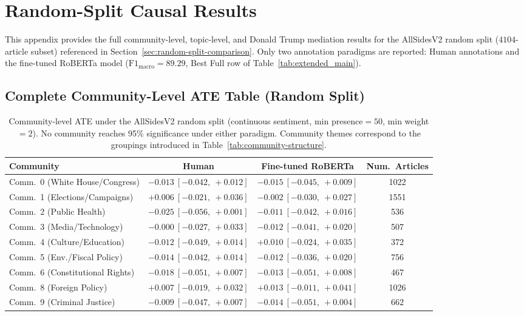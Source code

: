 \chapter{Random-Split Causal Results}
\label{sec:appendix-random-split}

This appendix provides the full community-level, topic-level, and Donald Trump mediation results for the AllSidesV2 random split ($\num{4104}$-article subset) referenced in Section~\ref{sec:random-split-comparison}. Only two annotation paradigms are reported: Human annotations and the fine-tuned RoBERTa model ($\text{F1}_{\text{macro}} = 89.29$, Best Full row of Table~\ref{tab:extended_main}).

\section{Complete Community-Level ATE Table (Random Split)}

\begin{table}[h!]
  \centering
  \small
  \begin{tabular}{l c c c}
  \toprule
  Community & Human & Fine-tuned RoBERTa & Num.\ Articles\\
  \midrule
  Comm.\ 0 (White House/Congress)    & $-0.013\ [-0.042,\ +0.012]$ & $-0.015\ [-0.045,\ +0.009]$ & \num{1022} \\
  Comm.\ 1 (Elections/Campaigns)     & $+0.006\ [-0.021,\ +0.036]$ & $-0.002\ [-0.030,\ +0.027]$ & \num{1551} \\
  Comm.\ 2 (Public Health)           & $-0.025\ [-0.056,\ +0.001]$ & $-0.011\ [-0.042,\ +0.016]$ & 536 \\
  Comm.\ 3 (Media/Technology)        & $-0.000\ [-0.027,\ +0.033]$ & $-0.012\ [-0.041,\ +0.020]$ & 507 \\
  Comm.\ 4 (Culture/Education)       & $-0.012\ [-0.049,\ +0.014]$ & $+0.010\ [-0.024,\ +0.035]$ & 372 \\
  Comm.\ 5 (Env./Fiscal Policy)      & $-0.014\ [-0.042,\ +0.014]$ & $-0.012\ [-0.036,\ +0.020]$ & 756 \\
  Comm.\ 6 (Constitutional Rights)   & $-0.018\ [-0.051,\ +0.007]$ & $-0.013\ [-0.051,\ +0.008]$ & 467 \\
  Comm.\ 8 (Foreign Policy)          & $+0.007\ [-0.019,\ +0.032]$ & $+0.013\ [-0.011,\ +0.041]$ & \num{1026} \\
  Comm.\ 9 (Criminal Justice)        & $-0.009\ [-0.047,\ +0.007]$ & $-0.014\ [-0.051,\ +0.004]$ & 662 \\
  \bottomrule
  \end{tabular}
  \caption{Community-level ATE under the AllSidesV2 random split (continuous sentiment, min presence${}=50$, min weight${}=2$). No community reaches 95\% significance under either paradigm. Community themes correspond to the groupings introduced in Table~\ref{tab:community-structure}.}
  \label{tab:random-community-ate-full}
\end{table}

